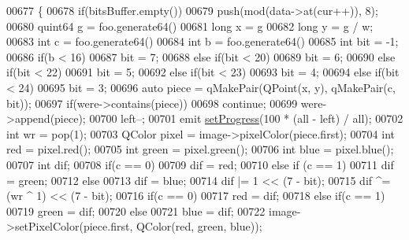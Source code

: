 \begin{DoxyCode}
00677         \{
00678             \textcolor{keywordflow}{if}(bitsBuffer.empty())
00679                 push(mod(data->at(cur++)), 8);
00680             quint64 g = foo.generate64() %
00681             \textcolor{keywordtype}{long} x = g %
00682             \textcolor{keywordtype}{long} y = g / w;
00683             \textcolor{keywordtype}{int} c = foo.generate64() %
00684             \textcolor{keywordtype}{int} b = foo.generate64() %
00685             \textcolor{keywordtype}{int} bit = -1;
00686             \textcolor{keywordflow}{if}(b < 16)
00687                 bit = 7;
00688             \textcolor{keywordflow}{else} \textcolor{keywordflow}{if}(bit < 20)
00689                 bit = 6;
00690             \textcolor{keywordflow}{else} \textcolor{keywordflow}{if}(bit < 22)
00691                 bit = 5;
00692             \textcolor{keywordflow}{else} \textcolor{keywordflow}{if}(bit < 23)
00693                 bit = 4;
00694             \textcolor{keywordflow}{else} \textcolor{keywordflow}{if}(bit < 24)
00695                 bit = 3;
00696             \textcolor{keyword}{auto} piece = qMakePair(QPoint(x, y), qMakePair(c, bit));
00697             \textcolor{keywordflow}{if}(were->contains(piece))
00698                 \textcolor{keywordflow}{continue};
00699             were->append(piece);
00700             left--;
00701             emit \hyperlink{class_model_p_c_afdcd80f0ed5062e145a71f09b0897547}{setProgress}(100 * (all - left) / all);
00702             \textcolor{keywordtype}{int} wr = pop(1);
00703             QColor pixel = image->pixelColor(piece.first);
00704             \textcolor{keywordtype}{int} red = pixel.red();
00705             \textcolor{keywordtype}{int} green = pixel.green();
00706             \textcolor{keywordtype}{int} blue = pixel.blue();
00707             \textcolor{keywordtype}{int} dif;
00708             \textcolor{keywordflow}{if}(c == 0)
00709                 dif = red;
00710             \textcolor{keywordflow}{else} \textcolor{keywordflow}{if} (c == 1)
00711                 dif = green;
00712             \textcolor{keywordflow}{else}
00713                 dif = blue;
00714             dif |= 1 << (7 - bit);
00715             dif ^= (wr ^ 1) << (7 - bit);
00716             \textcolor{keywordflow}{if}(c == 0)
00717                 red = dif;
00718             \textcolor{keywordflow}{else} \textcolor{keywordflow}{if}(c == 1)
00719                 green = dif;
00720             \textcolor{keywordflow}{else}
00721                 blue = dif;
00722             image->setPixelColor(piece.first, QColor(red, green, blue));

\end{DoxyCode}
